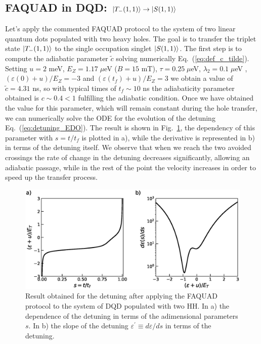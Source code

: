 \documentclass[a4paper,11pt]{article}
\begin{document}
\subsection{FAQUAD in DQD: $\ket{T_-(1,1)}\rightarrow\ket{S(1,1)}$}
Let's apply the commented FAQUAD protocol to the system of two linear quantum dots populated with two heavy holes. The goal is to transfer the triplet state $\ket{T_-(1,1)}$ to the single occupation singlet $\ket{S(1,1)}$. The first step is to compute the adiabatic parameter $\tilde{c}$ solving numerically Eq.~(\ref{eq:def_c_tilde}). Setting $u=2$ meV, $E_Z=1.17\; \mu$eV ($B=15$ mT), $\tau=0.25 \; \mu$eV, $\lambda_2=0.1\; \mu$eV , $(\varepsilon(0)+u)/E_Z=-3$ and $(\varepsilon(t_f)+u)/E_Z=3$ we obtain a value of $\tilde{c}=4.31$ ns, so with typical times of $t_f\sim 10$ ns the adiabaticity parameter obtained is $c\sim 0.4< 1$ fulfilling the adiabatic condition. Once we have obtained the value for this parameter, which will remain constant during the hole transfer, we can numerically solve the ODE for the evolution of the detuning Eq.~(\ref{eq:detuning_EDO}). The result is shown in Fig.~\ref{fig:FAQUAD_detuning_2QD_2HH}, the dependency of this parameter with $s=t/t_f$ is plotted in a), while the derivative is represented in b) in terms of the detuning itself. We observe that when we reach the two avoided crossings the rate of change in the detuning decreases significantly, allowing an adiabatic passage, while in the rest of the point the velocity increases in order to speed up the transfer process.
\begin{figure}[!htbp]
	\centering
	\includegraphics[width=1\linewidth]{FAQUAD_detuning_2QD_2HH.eps}
	\caption{Result obtained for the detuning after applying the FAQUAD protocol to the system of DQD populated with two HH. In a) the dependence of the detuning in terms of the adimensional parameters $s$. In b) the slope of the detuning $\varepsilon^\prime\equiv d \varepsilon/d s$ in terms of the detuning.}
	\label{fig:FAQUAD_detuning_2QD_2HH}
\end{figure}\\
\end{document}

